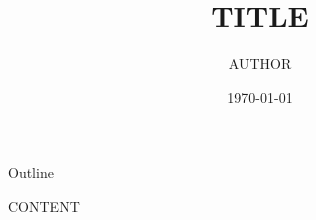 \documentclass[aspectratio=169]{beamer}
\title{{{TITLE}}}
{{SUBTITLE}}
\author{{{AUTHOR}}}
\institute{{{INSTITUTE}}}
\date{\today}
\begin{document}
\begin{frame}
    \titlepage
\end{frame}

\begin{frame}{Outline}
    \tableofcontents
\end{frame}

{{CONTENT}}
\end{document}
